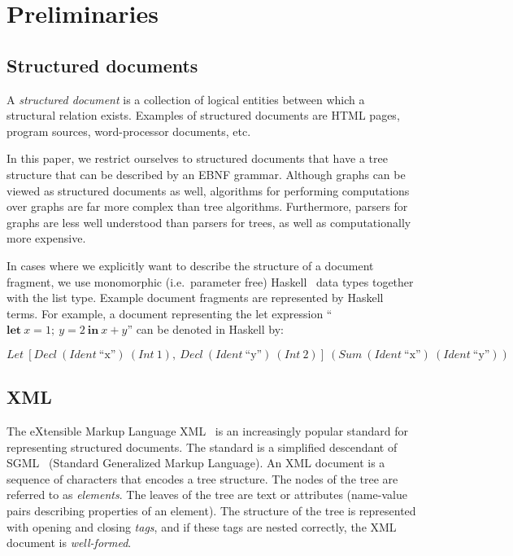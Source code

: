\documentclass{speauth}
\begin{document}
\section{Preliminaries}
\label{preliminaries}

\subsection{Structured documents} 
\label{sect:structdocs}

A {\em structured document} is a collection of logical entities between which a structural relation exists. Examples of structured documents are HTML pages, program sources, word-processor documents, etc. 

In this paper, we restrict ourselves to structured documents that have a tree structure that can be described by an EBNF grammar. Although graphs can be viewed as structured documents as well, algorithms for performing computations over graphs are far more complex than tree algorithms. Furthermore, parsers for graphs are less well understood than parsers for trees, as well as computationally more expensive. 

In cases where we explicitly want to describe the structure of a document fragment, we use monomorphic (i.e.\ parameter free) Haskell~\cite{peytonJones03haskell} data types together with the list type. Example document fragments are represented by Haskell terms. For example, a document representing the let expression  ``$\mathbf{let}~x = 1;~y = 2~\mathbf{in}~x+y$'' can be denoted in Haskell by: 

\begin{small}

$Let~[Decl~(Ident~\text{``x''})~(Int~1),~Decl~(Ident~\text{``y''})~(Int~2)]~(Sum~(Ident~\text{``x''})~(Ident~\text{``y''}))$

\end{small}

\subsection{XML}
The eXtensible Markup Language XML~\cite{xml11} is an increasingly popular standard for representing structured documents. The standard is a simplified descendant of SGML~\cite{sgml86} (Standard Generalized Markup Language). An XML document is a sequence of characters that encodes a tree structure. The nodes of the tree are referred to as {\em elements}. The leaves of the tree are text or attributes (name-value pairs describing properties of an element). The structure of the tree  is represented with opening and closing {\em tags}, and if these tags are nested correctly, the XML document is {\em well-formed}.
\end{document}
